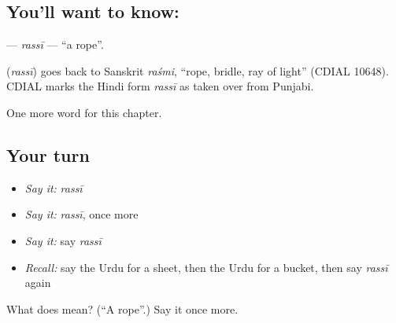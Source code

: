 \subsection*{You'll want to know: }
\textbf{} — \emph{rassī} — \textquotedblleft{}a rope\textquotedblright{}.

\begin{cousinweb}
\textbf{} (\emph{rassī}) goes back to Sanskrit \emph{raśmi}, \textquotedblleft{}rope, bridle, ray of light\textquotedblright{} (CDIAL 10648). CDIAL marks the Hindi form \emph{rassī} as taken over from Punjabi.
\end{cousinweb}

\begin{grammarlens}[title={What you've built}]
One more word for this chapter.
\end{grammarlens}

\subsection*{Your turn}
\begin{itemize}
\raggedright
  \item \emph{Say it:} \emph{rassī}
  \item \emph{Say it:} \emph{rassī}, once more
  \item \emph{Say it:} say \emph{rassī}
  \item \emph{Recall:} say the Urdu for a sheet, then the Urdu for a bucket, then say \emph{rassī} again
\end{itemize}

\begin{tcolorbox}[breakable,colback=teal!4,colframe=teal!35!black,title={Before you move on}]
What does  mean? (\textquotedblleft{}A rope\textquotedblright{}.) Say it once more.
\end{tcolorbox}
